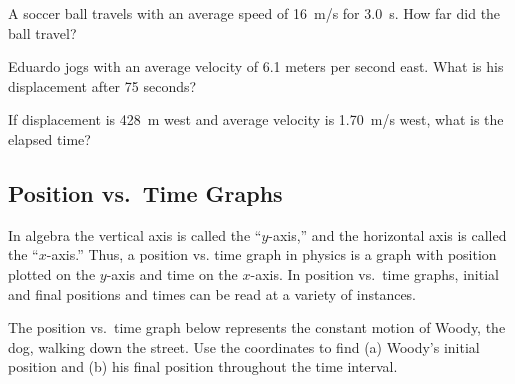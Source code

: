 \documentclass[main.tex]{subfiles}
\begin{document}
\begin{exercise} \label{Zj7dfC}
    A soccer ball travels with an average speed of \SI{16}{m/s} for \SI{3.0}{s}. How far did the ball travel?
\end{exercise}



\cyanhrule



\vspace{1em}

\begin{exercise} \label{ix2lKL}
Eduardo jogs with an average velocity of 6.1 meters per second east. What is his displacement after 75 seconds?
\end{exercise}


\begin{exercise} \label{BI1eOB}
If displacement is \SI{428}{m} west and average velocity is \SI{1.70}{m/s} west, what is the elapsed time?
\end{exercise}

\cyanhrule

\subsection{Position vs.~Time Graphs} \label{qoPhdL}

In algebra the vertical axis is called the ``$y$-axis,'' and the horizontal axis is called the ``$x$-axis.'' Thus, a \gls{position vs. time graph} in physics is a graph with position plotted on the $y$-axis and time on the $x$-axis. In position vs.~time graphs, initial and final positions and times can be read at a variety of instances.


\begin{example} \label{jS4CBO}
    The position vs.~time graph below represents the constant motion of Woody, the dog, walking down the street. Use the coordinates to find (a) Woody's initial position and (b) his final position throughout the time interval.
\end{example}

\begin{center}
\captionsetup{type=figure,margin=1in}
\label{Ujz7ke}
\end{center}
\end{document}
